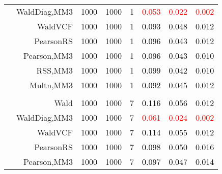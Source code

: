 \documentclass[
]{article}
\begin{document}
\begin{table}[H]
{\begin{tabular}[t]{lrrrrrrr}
\hspace{1em} & WaldDiag,MM3 & 1000 & 1000 & 1 & \textcolor{red}{0.053} & \textcolor{red}{0.022} & \textcolor{red}{0.002}\\

\hspace{1em} & WaldVCF & 1000 & 1000 & 1 & \textcolor{black}{0.093} & \textcolor{black}{0.048} & \textcolor{black}{0.012}\\

\hspace{1em} & PearsonRS & 1000 & 1000 & 1 & \textcolor{black}{0.096} & \textcolor{black}{0.043} & \textcolor{black}{0.012}\\

\hspace{1em} & Pearson,MM3 & 1000 & 1000 & 1 & \textcolor{black}{0.096} & \textcolor{black}{0.043} & \textcolor{black}{0.010}\\

\hspace{1em} & RSS,MM3 & 1000 & 1000 & 1 & \textcolor{black}{0.099} & \textcolor{black}{0.042} & \textcolor{black}{0.010}\\

\hspace{1em} & Multn,MM3 & 1000 & 1000 & 1 & \textcolor{black}{0.092} & \textcolor{black}{0.045} & \textcolor{black}{0.012}\\
\cmidrule{1-8}
\addlinespace[0.3em]
\multicolumn{8}{l}{\textbf{1F 15V}}\\
\hspace{1em} & Wald & 1000 & 1000 & 7 & \textcolor{black}{0.116} & \textcolor{black}{0.056} & \textcolor{black}{0.012}\\

\hspace{1em} & WaldDiag,MM3 & 1000 & 1000 & 7 & \textcolor{red}{0.061} & \textcolor{red}{0.024} & \textcolor{red}{0.002}\\

\hspace{1em} & WaldVCF & 1000 & 1000 & 7 & \textcolor{black}{0.114} & \textcolor{black}{0.055} & \textcolor{black}{0.012}\\

\hspace{1em} & PearsonRS & 1000 & 1000 & 7 & \textcolor{black}{0.098} & \textcolor{black}{0.050} & \textcolor{black}{0.016}\\

\hspace{1em} & Pearson,MM3 & 1000 & 1000 & 7 & \textcolor{black}{0.097} & \textcolor{black}{0.047} & \textcolor{black}{0.014}\\


\end{tabular}}
\end{table}
\end{document}
